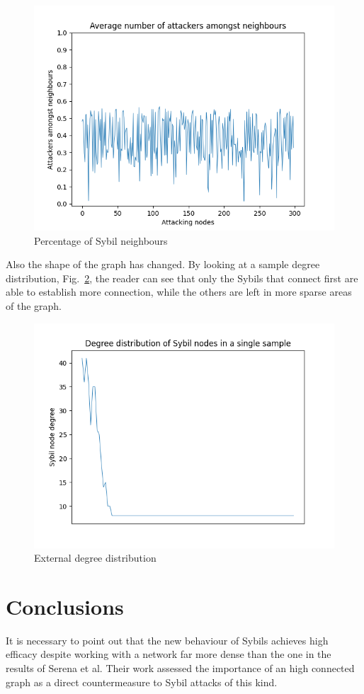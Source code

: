 \documentclass[12pt, letterpaper, twoside]{article}
\begin{document}
\begin{figure}[h!]
	\includegraphics[width=.8\textwidth]{pict/results/ext-hon-atk-neigh.png}
	\centering
	\caption{Percentage of Sybil neighbours}
	\label{fig:ex-atk-neigh}
\end{figure}

Also the shape of the graph has changed. By looking at a sample degree distribution, Fig.~\ref{fig:dd}, the reader can see that only the Sybils that connect first are able to establish more connection, while the others are left in more sparse areas of the graph.

\begin{figure}[h!]
	\includegraphics[width=.7\textwidth]{pict/results/ex-atk-dd.png}
	\centering
	\caption{External degree distribution}
	\label{fig:dd}
\end{figure}



\section{Conclusions}\label{sec:concl}
It is necessary to point out that the new behaviour of Sybils achieves high efficacy despite working with a network far more dense than the one in the results of Serena et al. Their work assessed the importance of an high connected graph as a direct countermeasure to Sybil attacks of this kind.













\end{document}
